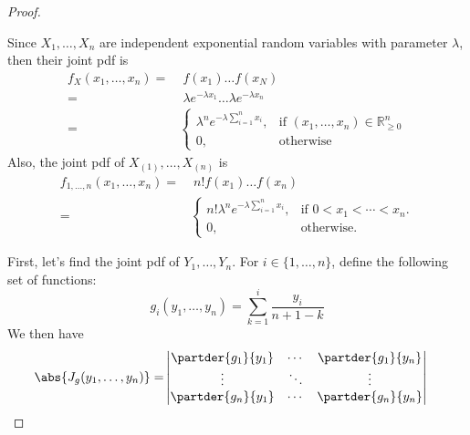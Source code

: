 \documentclass{mthe353answer}
\begin{document}
  \begin{questions}
    \setcounter{question}{1}
    \question{}
    \begin{solution}
      \begin{proof}
        \begin{note}
          Since \(X_1, \dots, X_n\) are independent exponential random variables
          with parameter \(\lambda\), then their joint pdf is
          \begin{align*}
            f_X(x_1, \dots, x_n) =&\; f(x_1) \dots f(x_N)\\
            =&\; \lambda e^{-\lambda x_1} \dots \lambda e^{-\lambda x_n}\\
            =&
            \begin{cases}
              \lambda^n e^{-\lambda \sum_{i=1}^n x_i}, & \text{if } (x_1, \dots, x_n) \in \mathbb{R}_{\ge 0}^n\\
              0, & \text{otherwise}
            \end{cases}
          \end{align*}
          Also, the joint pdf of \(X_{(1)}, \dots, X_{(n)}\) is
          \begin{align*}
            f_{1, \dots, n}(x_1, \dots, x_n) =&\; n!f(x_1) \dots f(x_n)\\
            =&
            \begin{cases}
              n!\lambda^n e^{-\lambda \sum_{i=1}^n x_i}, & \text{if } 0 < x_1 < \cdots < x_n.\\
              0, & \text{otherwise.}
            \end{cases}
          \end{align*}
        \end{note}
        First, let's find the joint pdf of \(Y_1, \dots, Y_n\). For \(i \in \{1, \dots, n\}\),
        define the following set of functions:
        \begin{equation*}
          g_i(y_1, \dots, y_n) = \sum_{k = 1}^i \frac{y_i}{n+1-k}
        \end{equation*}
        We then have
        \begin{align*}
          \abs{J_g(y_1, \dots, y_n)} =&
          \begin{vmatrix}
            \partder{g_1}{y_1} & \cdots & \partder{g_1}{y_n}\\
            \vdots & \ddots & \vdots\\
            \partder{g_n}{y_1} & \cdots & \partder{g_n}{y_n}\\

\end{vmatrix}
\end{align*}
\end{proof}
\end{solution}
\end{questions}
\end{document}
